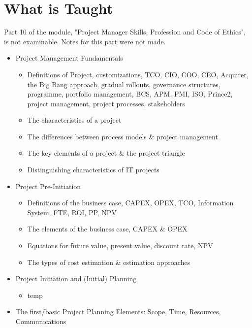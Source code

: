 \documentclass[]{project_plan}
\newcommand{\notincluded}[1]{\par\noindent\colorbox{shadecolor}
{\parbox{\dimexpr\textwidth-2\fboxsep\relax}{#1}}}
\begin{document}
\chapter*{What is Taught}

Part 10 of the module, "Project Manager Skills, Profession and Code of Ethics",
is not examinable. Notes for this part were not made.


\begin{itemize}
  \item Project Management Fundamentals
        \begin{itemize}
          \item Definitions of Project, customizations, TCO, CIO, COO, CEO,
                Acquirer, the Big Bang approach, gradual rollouts, governance
                structures, programme, portfolio management, BCS, APM, PMI, ISO,
                Prince2, project management, project processes, stakeholders
          \item The characteristics of a project
          \item The differences between process models \& project management
          \item The key elements of a project \& the project triangle
          \item Distinguishing characteristics of IT projects
        \end{itemize}
  \item Project Pre-Initiation
        \begin{itemize}
          \item Definitions of the business case, CAPEX, OPEX, TCO, Information System, FTE, ROI, PP, NPV
          \item The elements of the business case, CAPEX \& OPEX
          \item Equations for future value, present value, discount rate, NPV
          \item The types of cost estimation \& estimation approaches
        \end{itemize}
  \item Project Initiation and (Initial) Planning
        \begin{itemize}
          \item temp
        \end{itemize}
  \item The first/basic Project Planning Elements: Scope, Time, Resources, Communications

\end{itemize}
\end{document}
